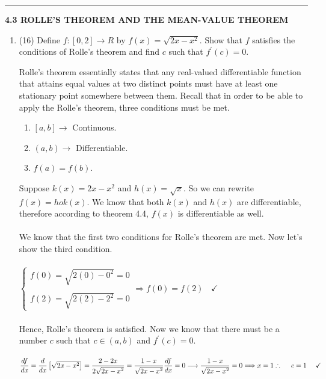 \documentclass[fleqn]{article}
\begin{document}
  \rule{15cm}{1pt}

  \textbf{4.3 ROLLE'S THEOREM AND THE MEAN-VALUE THEOREM}
  \begin{enumerate}
    \item (16) Define $f: [0, 2] \longrightarrow R$ by $f(x)=\sqrt{2x-x^2}$. Show that $f$ satisfies the conditions of Rolle's
    theorem and find $c$ such that $f^'(c)=0$.

      \textcolor{hwColor}{
        Rolle's theorem essentially states that any real-valued differentiable 
        function that attains equal values at two distinct points must have at least one stationary 
        point somewhere between them. Recall that in order to be able to apply the Rolle's theorem, three conditions 
        must be met.
        \begin{enumerate}
          \item $[a, b] \longrightarrow$ Continuous.
          \item $(a, b) \longrightarrow$ Differentiable.
          \item $f(a)=f(b)$.
        \end{enumerate}
      }

      \textcolor{hwColor}{
        Suppose $k(x)=2x-x^2$ and $h(x)=\sqrt{x}$. So we can rewrite $f(x)=hok(x)$. We know that both $k(x)$
        and $h(x)$ are differentiable, therefore according to theorem 4.4, $f(x)$ is differentiable as well.
        \\
        \\
        We know that the first two conditions for Rolle's theorem are met. Now let's show the third condition.
        \\
        \\
        $
          \begin{cases}
            f(0)=\sqrt{2(0)-0^2}=0
            \\
            \\
            f(2)=\sqrt{2(2)-2^2}=0
          \end{cases}
          \Longrightarrow f(0)=f(2) ~~~~ \checkmark
        $
        \\
        \\
        Hence, Rolle's theorem is satisfied. Now we know that there must be a number $c$ such that $c \in (a, b)$
        and $f^'(c)=0$.
        \\
        \\
        $
          \dfrac{df}{dx}=\dfrac{d}{dx} \left[\sqrt{2x-x^2}\right]=\dfrac{2-2x}{2 \sqrt{2x-x^2}}=\dfrac{1-x}{\sqrt{2x-x^2}}
          \\
          \\
          \\
          \dfrac{df}{dx}=0 \longrightarrow \dfrac{1-x}{\sqrt{2x-x^2}}=0 \Longrightarrow x=1
          \\
          \\
          \\
          \therefore ~~~~ c=1 ~~~~ \checkmark
        $ 
      }


\end{enumerate}
\end{document}
